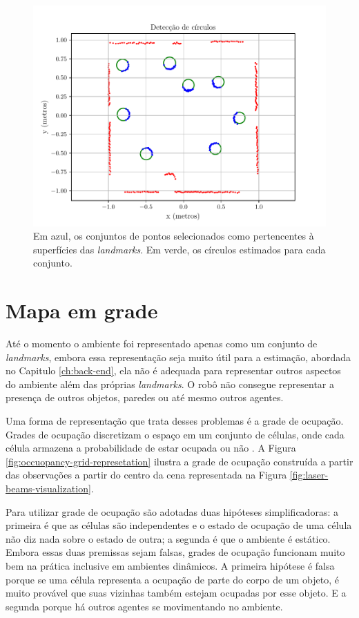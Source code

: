\begin{figure}[]
  \centering
  \includegraphics[width=.8\textwidth]{figs/circle_detection.pdf}
  \caption{Em azul, os conjuntos de pontos selecionados como pertencentes à superfícies das \textit{landmarks}. Em verde, os círculos 
  estimados para cada conjunto.}
  \label{fig:detected-circles}
\end{figure}

\section{Mapa em grade}
Até o momento o ambiente foi representado apenas como um conjunto de 
\textit{landmarks}, embora essa representação seja muito útil para a 
estimação, abordada no Capitulo \ref{ch:back-end}, ela não é adequada 
para representar outros aspectos do ambiente além das próprias \textit{landmarks}. O robô não consegue representar a presença de outros 
objetos, paredes ou até mesmo outros agentes.

Uma forma de representação que trata desses problemas é a grade de 
ocupação. Grades de ocupação discretizam o espaço em um conjunto de 
células, onde cada célula armazena a probabilidade de estar ocupada ou 
não \cite{elfes1989using}. A Figura \ref{fig:occuopancy-grid-represetation} ilustra a grade de ocupação construída a 
partir das observações a partir do centro da cena representada na Figura 
\ref{fig:laser-beams-visualization}.

Para utilizar grade de ocupação são adotadas duas hipóteses 
simplificadoras: a primeira é que as células são independentes e o 
estado de ocupação de uma célula não diz nada sobre o estado de outra; a 
segunda é que o ambiente é estático. Embora essas duas premissas sejam 
falsas, grades de ocupação funcionam muito bem na prática inclusive em 
ambientes dinâmicos. A primeira hipótese é falsa porque se uma célula 
representa a ocupação de parte do corpo de um objeto, é muito provável 
que suas vizinhas também estejam ocupadas por esse objeto. E a segunda 
porque há outros agentes se movimentando no ambiente.

